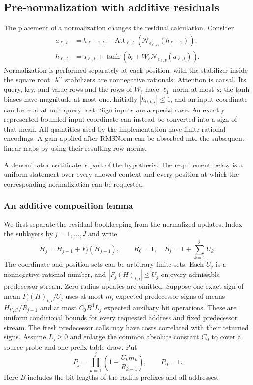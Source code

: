\subsection{Pre-normalization with additive residuals}
\label{sec:prenorm-additive}

The placement of a normalization changes the residual calculation. Consider
\begin{align}
 a_{\ell,t}
 &=h_{\ell-1,t}
   +\operatorname{Att}_{\ell,t}
      (\mathcal N_{\epsilon_{\ell,A}}(h_{\ell-1})),
 \label{eq:pn-att}\\
 h_{\ell,t}
 &=a_{\ell,t}
   +\tanh\!\left(b_\ell+
       W_\ell\mathcal N_{\epsilon_{\ell,F}}(a_{\ell,t})\right).
 \label{eq:pn-ff}
\end{align}
Normalization is performed separately at each position, with the stabilizer
inside the square root. All stabilizers are nonnegative rationals. Attention is causal. Its query, key, and value rows
and the rows of $W_\ell$ have $\ell_1$ norm at most $s$; the tanh biases
have magnitude at most one. Initially $|h_{0,t,i}|\le1$, and an input
coordinate can be read at unit query cost. Sign inputs are a special case.
An exactly represented bounded input coordinate can instead be converted
into a sign of that mean. All quantities used by the implementation have
finite rational encodings. A gain applied after RMSNorm can be absorbed
into the subsequent linear maps by using their resulting row norms.

A denominator certificate is part of the hypothesis. The requirement
below is a uniform statement over every allowed context and every
position at which the corresponding normalization can be requested.

\subsubsection{An additive composition lemma}

We first separate the residual bookkeeping from the normalized updates.
Index the sublayers by $j=1,\ldots,J$ and write
\[
 H_j=H_{j-1}+F_j(H_{j-1}),\qquad
 R_0=1,\quad R_j=1+\sum_{k=1}^j U_k.
\]
The coordinate and position sets can be arbitrary finite sets. Each $U_j$
is a nonnegative rational number, and $|F_j(H)_{t,i}|\le U_j$ on every
admissible predecessor stream. Zero-radius updates are omitted. Suppose
one exact sign of mean $F_j(H)_{t,i}/U_j$ uses at most $m_j$ expected
predecessor signs of means $H_{t',i'}/R_{j-1}$ and at most
$C_0 B^4 L_j$ expected auxiliary bit operations. These are uniform
conditional bounds for every requested address and fixed predecessor
stream. The fresh predecessor calls may have costs correlated with their
returned signs. Assume $L_j\ge0$ and enlarge the common absolute constant
$C_0$ to cover a source probe and one prefix-table draw. Put
\[
 P_j=\prod_{k=1}^j\left(1+\frac{U_km_k}{R_{k-1}}\right),
 \qquad P_0=1.
\]
Here $B$ includes the bit lengths of the radius prefixes and all addresses.

